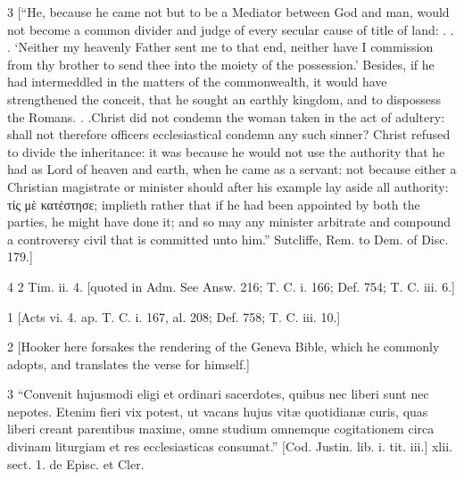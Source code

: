 3
[“He, because he came not but to be a Mediator between God and man, would not become a common divider and judge of every secular cause of title of land: . . . ‘Neither my heavenly Father sent me to that end, neither have I commission from thy brother to send thee into the moiety of the possession.’ Besides, if he had intermeddled in the matters of the commonwealth, it would have strengthened the conceit, that he sought an earthly kingdom, and to dispossess the Romans. . .Christ did not condemn the woman taken in the act of adultery: shall not therefore officers ecclesiastical condemn any such sinner? Christ refused to divide the inheritance: it was because he would not use the authority that he had as Lord of heaven and earth, when he came as a servant: not because either a Christian magistrate or minister should after his example lay aside all authority: τίς μὲ κατέστησε; implieth rather that if he had been appointed by both the parties, he might have done it; and so may any minister arbitrate and compound a controversy civil that is committed unto him.” Sutcliffe, Rem. to Dem. of Disc. 179.]

4
2 Tim. ii. 4. [quoted in Adm. See Answ. 216; T. C. i. 166; Def. 754; T. C. iii. 6.]

1
[Acts vi. 4. ap. T. C. i. 167, al. 208; Def. 758; T. C. iii. 10.]

2
[Hooker here forsakes the rendering of the Geneva Bible, which he commonly adopts, and translates the verse for himself.]

3
“Convenit hujusmodi eligi et ordinari sacerdotes, quibus nec liberi sunt nec nepotes. Etenim fieri vix potest, ut vacans hujus vitæ quotidianæ curis, quas liberi creant parentibus maxime, omne studium omnemque cogitationem circa divinam liturgiam et res ecclesiasticas consumat.” [Cod. Justin. lib. i. tit. iii.] xlii. sect. 1. de Episc. et Cler.

